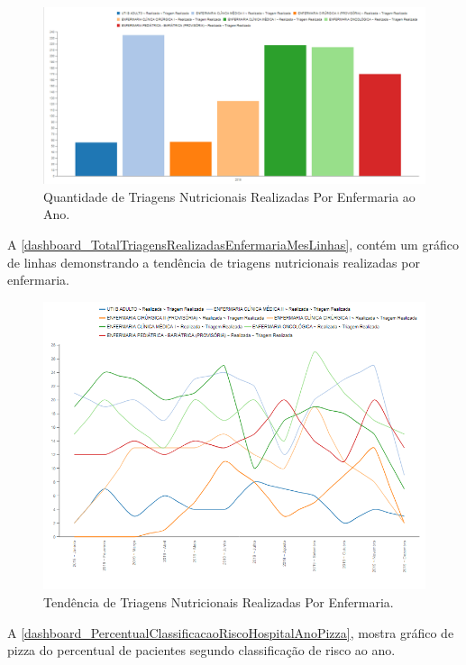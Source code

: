 \begin{figure}[htb]
	\caption{\label{dashboard_TotalTriagensRealizadasEnfermariaAnoBarras}Quantidade de Triagens Nutricionais Realizadas Por Enfermaria ao Ano.}
	\begin{center}
	    \includegraphics[scale=0.4]{Imagens/1.3.TotalTriagensRealizadasEnfermariaAnoBarras.png}
	\end{center}
\end{figure}

A \autoref{dashboard_TotalTriagensRealizadasEnfermariaMesLinhas}, contém um gráfico de linhas demonstrando a tendência de triagens nutricionais realizadas por enfermaria.

\begin{figure}[htb]
	\caption{\label{dashboard_TotalTriagensRealizadasEnfermariaMesLinhas}Tendência de Triagens Nutricionais Realizadas Por Enfermaria.}
	\begin{center}
	    \includegraphics[scale=0.475]{Imagens/1.4.TotalTriagensRealizadasEnfermariaMesLinhas.png}
	\end{center}
\end{figure}
\clearpage
A \autoref{dashboard_PercentualClassificacaoRiscoHospitalAnoPizza}, mostra gráfico de pizza do percentual de pacientes segundo classificação de risco ao ano.

